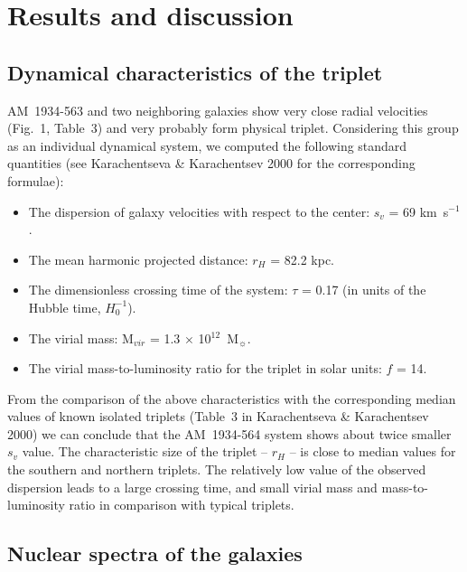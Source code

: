 \documentclass[]{aa}
\begin{document}
\section{Results and discussion}

\subsection{Dynamical characteristics of the triplet}

AM~1934-563 and two neighboring galaxies show very close 
radial velocities (Fig.~1, Table~3) and very probably form
physical triplet.
Considering this group as an individual dynamical system, we 
computed the following standard quantities (see Karachentseva \&
Karachentsev 2000 for the corresponding formulae):

\begin{itemize}
\item The dispersion of galaxy velocities with respect to the center:
$s_v$ = 69 km~s$^{-1}$.

\item The mean harmonic projected distance: $r_H$ = 82.2 kpc.

\item The dimensionless crossing time of the system:
$\tau$ = 0.17 (in units of the Hubble time, $H_0^{-1}$).

\item The virial mass: M$_{vir}$ = 1.3 $\times$ 10$^{12}$~M$_{\sun}$.

\item The virial mass-to-luminosity ratio for the triplet in solar
units: $f$ = 14.  
\end{itemize}

From the comparison of the above characteristics with the
corresponding median values of known isolated triplets
(Table~3 in Karachentseva \& Karachentsev 2000) we can conclude that
the AM~1934-564 system shows about twice smaller $s_v$ value.
The characteristic size of the triplet -- $r_H$ -- is close to median 
values for the southern and northern triplets. The relatively low 
value of the observed dispersion leads to a large crossing time, and 
small virial mass and mass-to-luminosity ratio in comparison with 
typical triplets. 

\subsection{Nuclear spectra of the galaxies}
\end{document}
